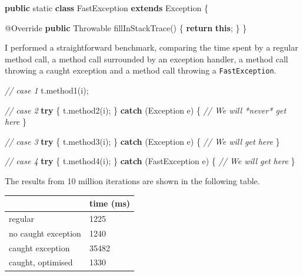 \documentclass[12pt,a4paper,oneside,openright]{book}
\newenvironment{Shaded}{\begin{snugshade}}{\end{snugshade}}
\newcommand{\KeywordTok}[1]{\textcolor[rgb]{0.13,0.29,0.53}{\textbf{{#1}}}}
\newcommand{\DataTypeTok}[1]{\textcolor[rgb]{0.13,0.29,0.53}{{#1}}}
\newcommand{\CommentTok}[1]{\textcolor[rgb]{0.56,0.35,0.01}{\textit{{#1}}}}
\newcommand{\FunctionTok}[1]{\textcolor[rgb]{0.00,0.00,0.00}{{#1}}}
\newcommand{\NormalTok}[1]{{#1}}
\begin{document}
\begin{Shaded}
\begin{Highlighting}[]
    \KeywordTok{public} \DataTypeTok{static} \KeywordTok{class} \NormalTok{FastException }\KeywordTok{extends} \NormalTok{Exception \{}

        \FunctionTok{@Override}
        \KeywordTok{public} \NormalTok{Throwable }\FunctionTok{fillInStackTrace}\NormalTok{() \{}
            \KeywordTok{return} \KeywordTok{this}\NormalTok{;}
        \NormalTok{\}}
    \NormalTok{\}}
\end{Highlighting}
\end{Shaded}

I performed a straightforward benchmark, comparing the time spent by a
regular method call, a method call surrounded by an exception handler, a
method call throwing a caught exception and a method call throwing a
\texttt{FastException}.

\begin{Shaded}
\begin{Highlighting}[]
        \CommentTok{// case 1}
        \NormalTok{t.}\FunctionTok{method1}\NormalTok{(i);}

        \CommentTok{// case 2}
        \KeywordTok{try} \NormalTok{\{}
            \NormalTok{t.}\FunctionTok{method2}\NormalTok{(i);}
        \NormalTok{\} }\KeywordTok{catch} \NormalTok{(Exception e) \{}
            \CommentTok{// We will *never* get here}
        \NormalTok{\}}

        \CommentTok{// case 3}
        \KeywordTok{try} \NormalTok{\{}
            \NormalTok{t.}\FunctionTok{method3}\NormalTok{(i);}
        \NormalTok{\} }\KeywordTok{catch} \NormalTok{(Exception e) \{}
            \CommentTok{// We will get here}
        \NormalTok{\}}

        \CommentTok{// case 4}
        \KeywordTok{try} \NormalTok{\{}
            \NormalTok{t.}\FunctionTok{method4}\NormalTok{(i);}
        \NormalTok{\} }\KeywordTok{catch} \NormalTok{(FastException e) \{}
            \CommentTok{// We will get here}
        \NormalTok{\}}
\end{Highlighting}
\end{Shaded}

The results from 10 million iterations are shown in the following table.

\begin{longtable}[c]{@{}ll@{}}
\toprule
& time (ms)\tabularnewline
\midrule
\endhead
regular & 1225\tabularnewline
no caught exception & 1240\tabularnewline
caught exception & 35482\tabularnewline
caught, optimised & 1330\tabularnewline
\bottomrule
\end{longtable}
\end{document}
